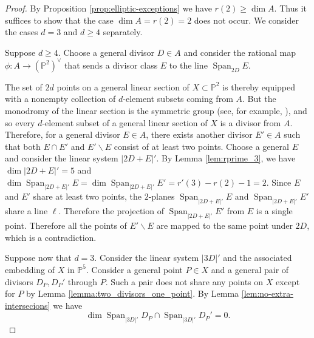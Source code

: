 \documentclass[11pt]{amsart}
\newcommand{\PP}{\mathbb{P}}
\newcommand{\Span}{\operatorname{Span}}
\theoremstyle{definition}
\theoremstyle{remark}
\begin{document}
\begin{proof}
By Proposition \ref{prop:elliptic-exceptions} we have $r(2) \geqslant \dim A$. Thus it suffices to show that the case $\dim A = r(2)=2$ does not occur. We consider the cases $d=3$ and $d \geqslant 4$ separately.

Suppose $d \geqslant 4$. Choose a general divisor $D\in A$ and consider the rational map $\phi: A \to (\PP^2)^\vee$ that sends a divisor class $E$ to the line $\Span_{2D}E$. 

The set of $2d$ points on a general linear section of $X \subset \PP^2$ is thereby equipped with a nonempty collection of $d$-element subsets coming from $A$. But the monodromy of the linear section is the symmetric group (see, for example, \cite[Lemma, Chapter III, page 111]{ACGH}), and so every $d$-element subset of a general linear section of $X$ is a divisor from $A$. Therefore, for a general divisor $E \in A$, there exists another divisor $E' \in A$ such that both $E \cap E'$ and $E' \smallsetminus E$ consist of at least two points. Choose a general $E$ and consider the linear system $|2D+E|'$. By  Lemma \ref{lem:rprime_3}, we have $\dim |2D+E|' = 5$ and $\dim \Span_{|2D+E|'}E = \dim \Span_{|2D+E|'} E' = r'(3)-r(2)-1=2$. Since $E$ and $E'$ share at least two points, the $2$-planes $\Span_{|2D+E|'}E$ and $\Span_{|2D+E|'}E'$ share a line $\ell$. Therefore the projection of $\Span_{|2D+E|'}E'$ from $E$ is a single point. Therefore all the points of $E' \smallsetminus E$ are mapped to the same point under $2D$, which is a contradiction.

Suppose now that $d=3$. Consider the linear system $|3D|'$ and the associated embedding of $X$ in $\PP^5$. Consider a general point $P \in X$ and a general pair of divisors $D_P, D_P'$ through $P$. Such a pair does not share any points on $X$ except for $P$ by Lemma \ref{lemma:two_divisors_one_point}. By Lemma \ref{lem:no-extra-intersecions}  we have
\[\dim \Span_{|3D|'} D_P \cap \Span_{|3D|'} D_P' = 0.\] 


\end{proof}
\end{document}
